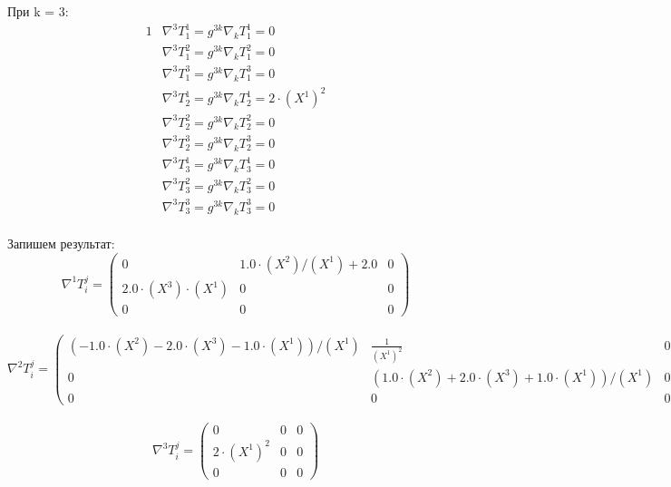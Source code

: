 \documentclass[a4paper, 12pt, oneside]{article}
\begin{document}
При k = 3:\\
\begin{alignat*}{1}
  & \nabla^3T^1_1 = g^{3k}\nabla_kT^1_1 = 0 \\
  & \nabla^3T^2_1 = g^{3k}\nabla_kT^2_1 = 0 \\
  & \nabla^3T^3_1 = g^{3k}\nabla_kT^3_1 = 0 \\
  & \nabla^3T^1_2 = g^{3k}\nabla_kT^1_2 = 2\cdot (X^1)^2 \\
  & \nabla^3T^2_2 = g^{3k}\nabla_kT^2_2 = 0 \\
  & \nabla^3T^3_2 = g^{3k}\nabla_kT^3_2 = 0 \\
  & \nabla^3T^1_3 = g^{3k}\nabla_kT^1_3 = 0 \\
  & \nabla^3T^2_3 = g^{3k}\nabla_kT^2_3 = 0 \\
  & \nabla^3T^3_3 = g^{3k}\nabla_kT^3_3 = 0 
\end{alignat*}\\
Запишем результат:\\
\[
\nabla^1T^j_i = \begin{pmatrix}
	0 & 1.0\cdot (X^2)/(X^1) + 2.0 & 0\\
	2.0\cdot (X^3)\cdot (X^1) & 0 & 0\\
	0 & 0 & 0
\end{pmatrix}
\]\\
\[
\nabla^2T^j_i = \begin{pmatrix}
	(-1.0\cdot (X^2) - 2.0\cdot (X^3) - 1.0\cdot (X^1))/(X^1) & \frac{1}{(X^1)^2} & 0\\
	0 & (1.0\cdot (X^2) + 2.0\cdot (X^3) + 1.0\cdot (X^1))/(X^1) & 0\\
	0 & 0 & 0
\end{pmatrix}
\]\\
\[
\nabla^3T^j_i = \begin{pmatrix}
	0 & 0 & 0\\
	2\cdot (X^1)^2 & 0 & 0\\
	0 & 0 & 0
\end{pmatrix}
\]\\
\end{document}
